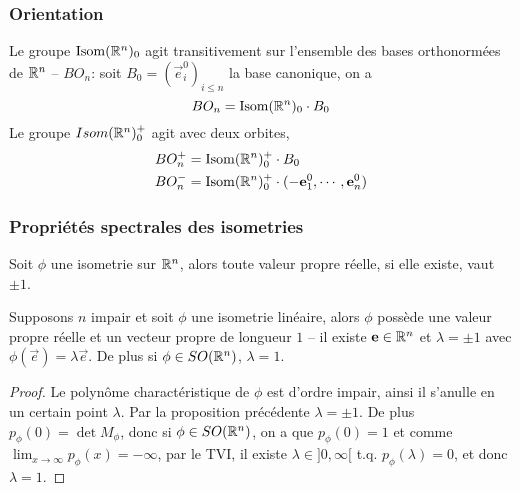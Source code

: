 \subsubsection{Orientation}

\begin{proposition}
	Le groupe $\operatorname{Isom}(\mathbb{R}^n)_0$ agit transitivement sur l'ensemble des bases
	orthonormées de $\mathbb{R}^n$ -- $BO_n$:
	soit $B_0 = (\vec{e}_i^0)_{i \leq n}$ la base canonique, on a
	\begin{equation*}
		BO_n = \operatorname{Isom}(\mathbb{R}^n)_0 \cdot B_0
	\end{equation*}
	Le groupe $Isom(\mathbb{R}^n)_0^+$ agit avec deux orbites,
	\begin{align*}
		BO_n^+ &= \operatorname{Isom}(\mathbb{R}^n)_0^+ \cdot B_0 \\
		BO_n^- &= \operatorname{Isom}(\mathbb{R}^n)_0^+ \cdot (-\mathbf{e}_1^0, \cdots, \mathbf{e}_n^0)
	\end{align*}
\end{proposition}

\subsubsection{Propriétés spectrales des isometries}

\begin{proposition}
	Soit $\phi$ une isometrie sur $\mathbb{R}^n$, alors toute valeur propre réelle, si
	elle existe, vaut $\pm 1$.
\end{proposition}

\begin{proposition}
	Supposons $n$ impair et soit $\phi$ une isometrie linéaire, alors $\phi$
	possède une valeur propre réelle et un vecteur propre de longueur $1$ -- il
	existe $\mathbf{e} \in \mathbb{R}^n$ et $\lambda = \pm 1$ avec $\phi(\vec{e}) = \lambda
	\vec{e}$. De plus si $\phi \in SO(\mathbb{R}^n)$, $\lambda = 1$.
\end{proposition}

\begin{proof}
	Le polynôme charactéristique de $\phi$ est d'ordre impair, ainsi il s'anulle
	en un certain point $\lambda$. Par la proposition précédente $\lambda = \pm
	1$. De plus $p_\phi(0) = \det M_\phi$, donc si $\phi \in SO(\mathbb{R}^n)$, on a que 
	$p_\phi(0) = 1$ et comme $\lim_{x\to \infty} p_\phi(x) = -\infty$, par le
	TVI, il existe $\lambda \in ]0, \infty[$ t.q. $p_\phi(\lambda) = 0$, et donc 
	$\lambda = 1$.
\end{proof}


